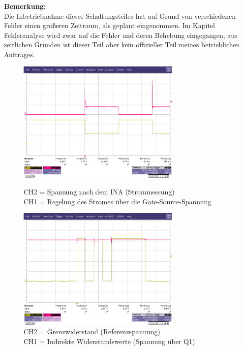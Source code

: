 \vspace{1,5cm}
\textbf{Bemerkung:}
\\
Die Inbetriebnahme dieses Schaltungsteiles hat auf Grund von verschiedenen Fehler einen größeren Zeitraum, als geplant eingenommen. Im Kapitel Fehleranalyse wird zwar auf die Fehler und deren Behebung eingegangen, aus zeitlichen Gründen ist dieser Teil aber kein offizieller Teil meines betrieblichen Auftrages.


\begin{figure}[htb]
    \centering
    \begin{minipage}[t]{0.45\linewidth}
        \centering
        \includegraphics[width=8cm]{Bilder/INA-Spannung.png}
        \caption{CH2 = Spannung nach dem INA (Strommessung)\\
        			CH1 = Regelung des Stromes über die Gate-Source-Spannung}
    \end{minipage}%
    \hfill
    \begin{minipage}[t]{0.45\linewidth}
        \centering
        \includegraphics[width=8cm]{Bilder/Auswertung-Widerstand.png}
        \caption{CH2 = Grenzwiderstand (Referenzspannung)\\ 
        			CH1 = Indirekte Widerstandswerte (Spannung über Q1)}
    \end{minipage} 
\end{figure}

